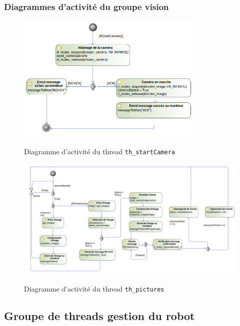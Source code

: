 \documentclass[11pt, a4paper]{paper}
\begin{document}
\subsubsection{Diagrammes d'activité du groupe vision}

\begin{figure}[H]
\label{fig:th_startCamera}
\begin{center}
{\includegraphics[width=0.8\textwidth]{./figures-pdf/th_startCamera}}
{\caption{Diagramme d'activité du thread {\tt th\_startCamera}}}
\end{center}
\end{figure}

\begin{figure}[H]
\label{fig:th_pictures}
\begin{center}
{\includegraphics[width=1.0\textwidth]{./figures-pdf/th_pictures}}
{\caption{Diagramme d'activité du thread {\tt th\_pictures}}}
\end{center}
\end{figure}

\subsection{Groupe de threads gestion du robot}
\end{document}
